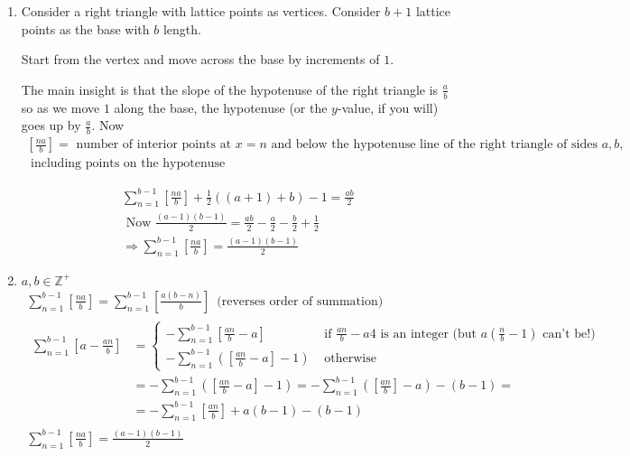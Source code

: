 \documentclass[twoside]{amsart}
\theoremstyle{plain}
\theoremstyle{definition}
\newcommand{\exercisehead}[1]
  {\smallskip
   \noindent{\small\bf Exercise #1.}}
\begin{document}
\exercisehead{7}
\begin{enumerate}
\item Consider a right triangle with lattice points as vertices.  Consider $b+1$ lattice points as the base with $b$ length.  

Start from the vertex and move across the base by increments of $1$.  

The main insight is that the slope of the hypotenuse of the right triangle is $\frac{a}{b}$ so as we move $1$ along the base, the hypotenuse (or the $y$-value, if you will) goes up by $\frac{a}{b}$.  Now
\begin{multline}
\left[ \frac{na}{b} \right] = \text{ number of interior points at $x=n$ and below the hypotenuse line of the right triangle of sides $a,b$,} \\
\text{ including points on the hypotenuse }
\end{multline}

\[
\begin{gathered}
  \sum_{n=1}^{b-1} \left[ \frac{na}{b} \right] + \frac{1}{2} ((a+1) +b ) -1 = \frac{ab}{2} \\
  \text{ Now } \frac{ (a-1)(b-1)}{2} = \frac{ab}{2} - \frac{a}{2} - \frac{b}{2} + \frac{1}{2} \\
  \Longrightarrow \sum_{n=1}^{b-1} \left[ \frac{na}{b} \right] = \frac{(a-1)(b-1)}{2}
\end{gathered}
\]
\item $a,b \in \mathbb{Z}^+$ 
\[
\begin{gathered}
  \sum_{n=1}^{b-1} \left[ \frac{na}{b} \right] = \sum_{n=1}^{b-1} \left[ \frac{ a(b-n)}{b} \right] \, \text{ (reverses order of summation) } \\ 
  \begin{aligned}
  \sum_{n=1}^{b-1} \left[ a - \frac{an}{b} \right] & = \begin{cases} - \sum_{n=1}^{b-1} \left[ \frac{an}{b} - a \right] & \text{ if $\frac{an}{b} -a 4$ is an integer (but $a \left( \frac{n}{b} - 1 \right) $ can't be!) } \\
    -  \sum_{n=1}^{b-1} \left( \left[ \frac{an}{b} - a \right] -1 \right) & \text{ otherwise } 
  \end{cases} \\
  & = -  \sum_{n=1}^{b-1} \left( \left[ \frac{an}{b} - a \right] -1 \right) = -   \sum_{n=1}^{b-1} \left( \left[ \frac{an}{b} \right] -a \right)- (b-1) = \\
  & = -\sum_{n=1}^{b-1} \left[ \frac{an}{b} \right] + a(b-1) - (b-1)
\end{aligned} \\
  \sum_{n=1}^{b-1} \left[ \frac{na}{b} \right] = \frac{(a-1)(b-1)}{2}
\end{gathered}
\]
\end{enumerate}
\end{document}
